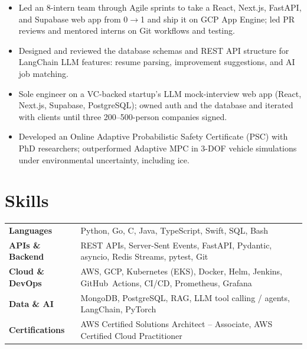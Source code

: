 \documentclass[11pt, letterpaper]{article}
\begin{document}
\begin{itemize}
  \item Led an 8-intern team through Agile sprints to take a React, Next.js, FastAPI, and Supabase web app from 0$\to$1 and ship it on GCP App Engine; led PR reviews and mentored interns on Git workflows and testing.
  \item Designed and reviewed the database schemas and REST API structure for LangChain LLM features: resume parsing, improvement suggestions, and AI job matching.
\end{itemize}

\begin{itemize}
  \item Sole engineer on a VC-backed startup's LLM mock-interview web app (React, Next.js, Supabase, PostgreSQL); owned auth and the database and iterated with clients until three 200--500-person companies signed.
\end{itemize}

\begin{itemize}
  \item Developed an Online Adaptive Probabilistic Safety Certificate (PSC) with PhD researchers; outperformed Adaptive MPC in 3-DOF vehicle simulations under environmental uncertainty, including ice.
\end{itemize}

\section{Skills}
\begin{tabularx}{\textwidth}{@{}l @{\hspace{7pt}} >{\raggedright\arraybackslash}X@{}}
  \textbf{Languages} & Python, Go, C, Java, TypeScript, Swift, SQL, Bash \\[1pt]
  \textbf{APIs \& Backend} & REST APIs, Server-Sent Events, FastAPI, Pydantic, asyncio, Redis Streams, pytest, Git \\[1pt]
  \textbf{Cloud \& DevOps} & AWS, GCP, Kubernetes (EKS), Docker, Helm, Jenkins, GitHub~Actions, CI/CD, Prometheus, Grafana \\[1pt]
  \textbf{Data \& AI} & MongoDB, PostgreSQL, RAG, LLM tool calling / agents, LangChain, PyTorch \\[1pt]
  \textbf{Certifications} & AWS Certified Solutions Architect -- Associate, AWS Certified Cloud Practitioner \\
\end{tabularx}
\end{document}
